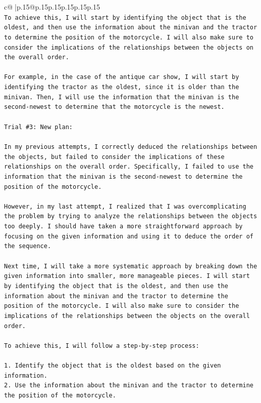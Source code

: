 \documentclass{article}
\begin{document}
{\begin{supertabular}{c@{$\;$}|p{.15\linewidth}@{}p{.15\linewidth}p{.15\linewidth}p{.15\linewidth}p{.15\linewidth}p{.15\linewidth}}
{{{\\ 
\texttt{To achieve this, I will start by identifying the object that is the oldest, and then use the information about the minivan and the tractor to determine the position of the motorcycle. I will also make sure to consider the implications of the relationships between the objects on the overall order. } \\
\\ 
\texttt{For example, in the case of the antique car show, I will start by identifying the tractor as the oldest, since it is older than the minivan. Then, I will use the information that the minivan is the second{-}newest to determine that the motorcycle is the newest.} \\
\\ 
\texttt{Trial \#3: New plan: } \\
\\ 
\texttt{In my previous attempts, I correctly deduced the relationships between the objects, but failed to consider the implications of these relationships on the overall order. Specifically, I failed to use the information that the minivan is the second{-}newest to determine the position of the motorcycle. } \\
\\ 
\texttt{However, in my last attempt, I realized that I was overcomplicating the problem by trying to analyze the relationships between the objects too deeply. I should have taken a more straightforward approach by focusing on the given information and using it to deduce the order of the sequence.} \\
\\ 
\texttt{Next time, I will take a more systematic approach by breaking down the given information into smaller, more manageable pieces. I will start by identifying the object that is the oldest, and then use the information about the minivan and the tractor to determine the position of the motorcycle. I will also make sure to consider the implications of the relationships between the objects on the overall order.} \\
\\ 
\texttt{To achieve this, I will follow a step{-}by{-}step process:} \\
\\ 
\texttt{1. Identify the object that is the oldest based on the given information.} \\
\texttt{2. Use the information about the minivan and the tractor to determine the position of the motorcycle.} \\
}}}
\end{supertabular}}
\end{document}
